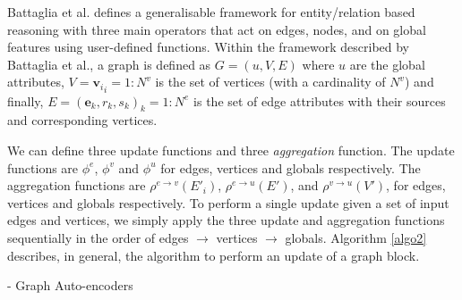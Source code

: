 Battaglia et al. \cite{battaglia2018relational} defines a generalisable framework for entity/relation based reasoning with three main operators that act on edges, nodes, and on global features using user-defined functions. Within the framework described by Battaglia et al., a graph is defined as $G = (u, V, E)$ where $u$ are the global attributes, $V = {\mathbf{v}_i}_i={1:N^v}$ is the set of vertices (with a cardinality of $N^v$) and finally, $E = {(\mathbf{e}_k, r_k, s_k)}_k={1:N^e}$ is the set of edge attributes with their sources and corresponding vertices.



We can define three update functions and three \textit{aggregation} function. The update functions are $\phi^e$, $\phi^v$ and $\phi^u$ for edges, vertices and globals respectively. The aggregation functions are $\rho^{e \rightarrow v} (E'_i)$, $\rho^{e \rightarrow u} (E')$, and $\rho^{v \rightarrow u} (V')$, for edges, vertices and globals respectively. To perform a single update given a set of input edges and vertices, we simply apply the three update and aggregation functions sequentially in the order of edges $\rightarrow$ vertices $\rightarrow$ globals. Algorithm \ref{algo2} describes, in general, the algorithm to perform an update of a graph block.

- Graph Auto-encoders


